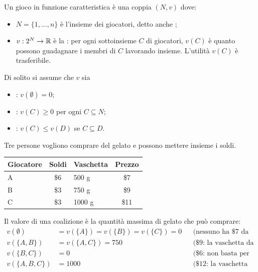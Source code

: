 \begin{definizione}
Un gioco in funzione caratteristica è una coppia $(N, v)$ dove:
\begin{itemize}
  \item $N = \{1,\dots,n\}$ è l'insieme dei giocatori, detto anche ;
  \item $v : 2^N \to \mathbb{R}$ è la : per ogni sottoinsieme $C$ di
        giocatori, $v(C)$ è quanto possono guadagnare i membri di $C$ lavorando insieme.
        L'utilità $v(C)$ è trasferibile.
\end{itemize}
Di solito si assume che $v$ sia
\begin{itemize}
  \item {}: $v(\emptyset) = 0$;
  \item {}: $v(C) \ge 0$ per ogni $C \subseteq N$;
  \item {}: $v(C) \le v(D)$ se $C \subseteq D$.
\end{itemize}
\end{definizione}

\begin{esempio}[il gelato]
Tre persone vogliono comprare del gelato e possono mettere insieme i soldi.
\begin{center}
\renewcommand{\arraystretch}{1.2}
\begin{tabular}{lc@{\qquad\qquad}lc}
\toprule
Giocatore & Soldi & Vaschetta & Prezzo \\
\midrule
A & \$6 & 500 g & \$7 \\
B & \$3 & 750 g & \$9 \\
C & \$3 & 1000 g & \$11 \\
\bottomrule
\end{tabular}
\end{center}
Il valore di una coalizione è la quantità massima di gelato che può comprare:
\[
\begin{aligned}
  v(\emptyset) &= v(\{A\}) = v(\{B\}) = v(\{C\}) = 0
    &&\text{(nessuno ha \$7 da solo)}\\
  v(\{A,B\}) &= v(\{A,C\}) = 750
    &&\text{(\$9: la vaschetta da 750 g)}\\
  v(\{B,C\}) &= 0 &&\text{(\$6: non basta per nulla)}\\
  v(\{A,B,C\}) &= 1000 &&\text{(\$12: la vaschetta da 1000 g).}
\end{aligned}
\]
\end{esempio}

